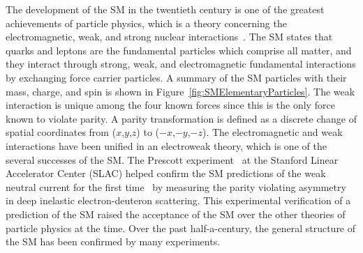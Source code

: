 The development of the SM in the twentieth century is one of the greatest achievements of particle physics, which is a theory concerning the electromagnetic, weak, and strong nuclear interactions~\cite{book:QuarksAndLeptones}. 
The SM states that quarks and leptons are the fundamental particles which comprise all matter, and they interact through strong, weak, and electromagnetic fundamental interactions by exchanging force carrier particles.
A summary of the SM particles with their mass, charge, and spin is shown in Figure~\ref{fig:SMElementaryParticles}.
The weak interaction is unique among the four known forces since this is the only force known to violate parity. 
A parity transformation is defined as a discrete change of spatial coordinates from ($x$,$y$,$z$) to ($-x$,$-y$,$-z$).
The electromagnetic and weak interactions have been unified in an electroweak theory, which is one of the several successes of the SM. The Prescott experiment~\cite{Prescott1978347} at the Stanford Linear Accelerator Center (SLAC) helped confirm the SM predictions of the weak neutral current for the first time~\cite{Hasert1973138, Hasert1973121, Hasert19741} by measuring the parity violating asymmetry in deep inelastic electron-deuteron scattering. 
This experimental verification of a prediction of the SM raised the acceptance of the SM over the other theories of particle physics at the time. 
Over the past half-a-century, the general structure of the SM has been confirmed by many experiments.

